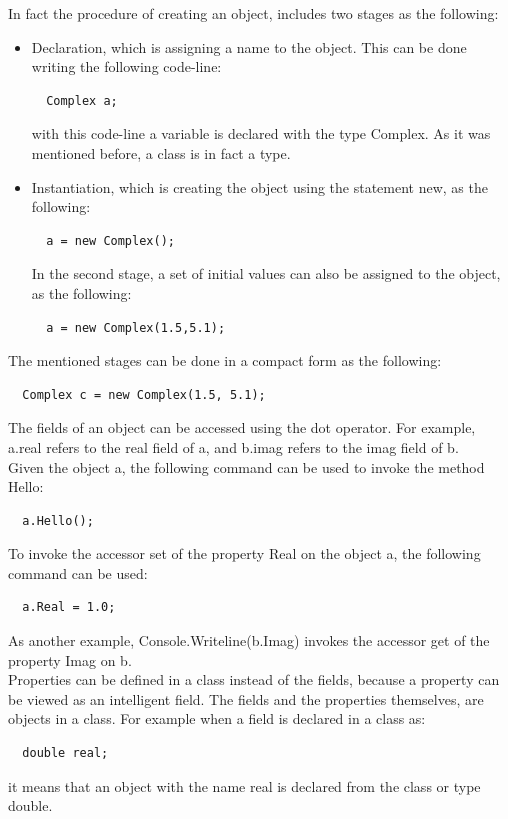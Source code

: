 \documentclass[11pt,twoside,a4paper]{fdyartcl}
\begin{document}
In fact the procedure of creating an object, includes two stages as the following:
\begin{itemize}
\item Declaration, which is assigning a name to the object. This can be done writing the following code-line:
{\scriptsize \begin{verbatim}
  Complex a;
\end{verbatim}}
with this code-line a variable is declared with the type {\scriptsize Complex}. As it was mentioned before, a class is in fact a type.
\item Instantiation, which is creating the object using the statement {\scriptsize new}, as the following:
{\scriptsize \begin{verbatim}
  a = new Complex();
\end{verbatim}}
In the second stage, a set of initial values can also be assigned to the object, as the following:
{\scriptsize \begin{verbatim}
  a = new Complex(1.5,5.1);
\end{verbatim}}
\end{itemize}
The mentioned stages can be done in a compact form as the following:
{\scriptsize \begin{verbatim}
  Complex c = new Complex(1.5, 5.1);
\end{verbatim}}
The fields of an object can be accessed using the dot operator. For example, {\scriptsize a.real} refers to the {\scriptsize real} field of {\scriptsize a}, and {\scriptsize b.imag} refers to the {\scriptsize imag} field of {\scriptsize b}.\\
Given the object {\scriptsize a}, the following command can be used to invoke the method {\scriptsize Hello}:
{\scriptsize \begin{verbatim}
  a.Hello();
\end{verbatim}}
To invoke the accessor {\scriptsize set} of the property {\scriptsize Real} on the object {\scriptsize a}, the following command can be used:
{\scriptsize \begin{verbatim}
  a.Real = 1.0;
\end{verbatim}}
As another example, {\scriptsize Console.Writeline(b.Imag)} invokes the accessor {\scriptsize get} of the property {\scriptsize Imag} on {\scriptsize b}.\\
Properties can be defined in a class instead of the fields, because a property can be viewed as an intelligent field. The fields and the properties themselves, are objects in a class. For example when a field is declared in a class as:
{\scriptsize \begin{verbatim}
  double real;
\end{verbatim}}
it means that an object with the name {\scriptsize real} is declared from the class or type {\scriptsize double}.
\end{document}
